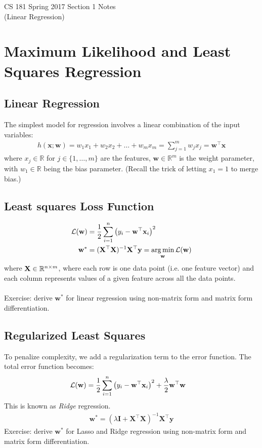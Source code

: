 \documentclass[11pt,letterpaper]{article}
\begin{document}
\begin{center}
\LARGE{CS 181 Spring 2017 Section 1 Notes}\\
(Linear Regression)
\end{center}

\section{Maximum Likelihood and Least Squares Regression}
\subsection{Linear Regression}
The simplest model for regression involves a linear combination of the input variables:
\begin{align}
    h(\mathbf{x};\mathbf{w})= w_1x_1+w_2x_2+\ldots+w_mx_m = \sum_{j=1}^m w_jx_j = \mathbf{w}^\top\mathbf{x}
\end{align}
where $x_j \in \mathbb{R}$ for $j \in \{1,\hdots,m\}$ are the features, $\mathbf{w} \in \mathbb{R}^m$ is the weight parameter, with $w_1 \in \mathbb{R}$ being the bias parameter.
(Recall the trick of letting $x_1 = 1$ to merge bias.)

\subsection{Least squares Loss Function}
\begin{align}
    \mcL(\mathbf{w}) &=\dfrac{1}{2}\sum_{i=1}^n\left(y_i-\mathbf{w}^\top\mathbf{x}_i\right)^2\\
    \mathbf{w}^* &= (\mathbf{X}^\top\mathbf{X})^{-1}\mathbf{X}^\top\mathbf{y} = \argmin_{\mathbf{w}} \mcL(\mathbf{w})
\end{align}
where $\mathbf{X} \in \mathbb{R}^{n \times m}$, where each row is one data point (i.e. one feature vector) and each column represents values of a given feature across all the data points.\\
\\
Exercise: derive $\mathbf{w}^*$ for linear regression using non-matrix form and matrix form differentiation.
\vspace{8cm}

\subsection{Regularized Least Squares}
To penalize complexity, we add a regularization term to the error function. The total error function becomes:
\begin{align}
    \mathcal{L}(\mathbf{w})&= \dfrac{1}{2}\sum_{i=1}^n\left(y_i-\mathbf{w}^\top\mathbf{x}_i\right)^2 + \dfrac{\lambda}{2}\mathbf{w}^\top\mathbf{w}
\end{align}
This is known as \textit{Ridge} regression.
\begin{align}
    \mathbf{w}^* = (\lambda\mathbf{I}+\mathbf{X}^\top\mathbf{X})^{-1}\mathbf{X}^\top\mathbf{y}
\end{align}
Exercise: derive $\mathbf{w}^*$ for Lasso and Ridge regression using non-matrix form and matrix form differentiation.
\vspace{8cm}
\end{document}
